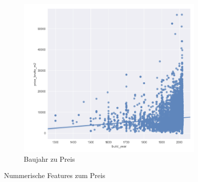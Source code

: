 \begin{figure}[h]
\begin{subfigure}{.5\textwidth}
    \includegraphics[width=\linewidth]{images/anhang/analysis/BYear_zu_preis.png}
    \caption{Baujahr zu Preis}
  \end{subfigure}
  \caption{Nummerische Features zum Preis}
  \end{figure}


\clearpage
